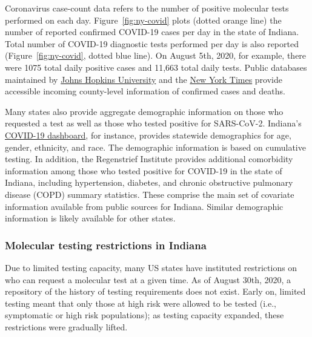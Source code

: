 \documentclass[11pt]{amsart}
\begin{document}


Coronavirus case-count data refers to the number of positive molecular tests performed on each day.  Figure~\ref{fig:ny-covid} plots (dotted orange line) the number of reported confirmed COVID-19 cases per day in the state of Indiana.  Total number of COVID-19 diagnostic tests performed per day is also reported (Figure~\ref{fig:ny-covid}, dotted blue line). On August 5th, 2020, for example, there were 1075 total daily positive cases and 11,663 total daily tests.  Public databases maintained by \href{https://bit.ly/2UqFSuA}{Johns Hopkins University} and the \href{https://bit.ly/2vUHfrK}{New York Times} provide accessible incoming county-level information of confirmed cases and deaths.

Many states also provide aggregate demographic information on those who requested a test as well as those who tested positive for SARS-CoV-2. Indiana's \href{https://www.coronavirus.in.gov/2393.htm}{COVID-19 dashboard}, for instance, provides statewide demographics for age, gender, ethnicity, and race.  The demographic information is based on cumulative testing.  In addition, the Regenstrief Institute provides additional comorbidity information among those who tested positive for COVID-19 in the state of Indiana, including hypertension, diabetes, and chronic obstructive pulmonary disease (COPD) summary statistics. These comprise the main set of covariate information available from public sources for Indiana. Similar demographic information is likely available for other states.
%




\subsubsection{Molecular testing restrictions in Indiana}

Due to limited testing capacity, many US states have instituted restrictions on who can request a molecular test at a given time.
As of August 30th, 2020, a repository of the history of testing requirements does not exist.  Early on, limited testing meant that only those at high risk were allowed to be tested (i.e., symptomatic or high risk populations); as testing capacity expanded, these restrictions were gradually lifted.
\end{document}

